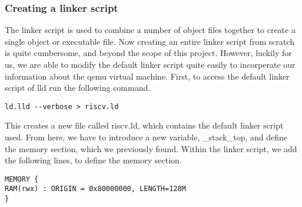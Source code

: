 \subsubsection{Creating a linker script}
The linker script is used to combine a number of object files together to create
a single object or executable file. Now creating an entire linker script from
scratch is quite cumbersome, and beyond the scope of this project. However,
luckily for us, we are able to modify the default linker script quite easily to
incorperate our information about the qemu virtual machine. First, to access the
default linker script of lld run the following command.
\begin{lstlisting}
ld.lld --verbose > riscv.ld
\end{lstlisting}
This creates a new file called riscv.ld, which contains the default linker
script used. From here, we have to introduce a new variable, \_stack\_top, and
define the memory section, which we previously found. Within the linker script,
we add the following lines, to define the memory section.

\begin{lstlisting}
MEMORY {
RAM(rwx) : ORIGIN = 0x80000000, LENGTH=128M
}
\end{lstlisting}



